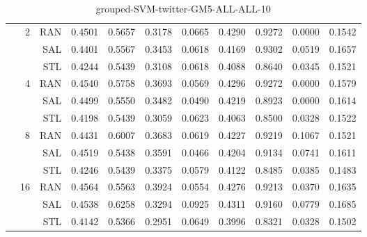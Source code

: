 \begin{center}
\begin{table}[htbp]
\begin{center}
\begin{tabular}{ | r | r | r | r | r | r | r | r | r | r | r |}
 & \multirow{3}{*}{2} & RAN & 0.4501 & 0.5657 & 0.3178 & 0.0665 & 0.4290 & 0.9272 & 0.0000 & 0.1542\\ \cline{3-11}
 &   & SAL & 0.4401 & 0.5567 & 0.3453 & 0.0618 & 0.4169 & 0.9302 & 0.0519 & 0.1657\\ \cline{3-11}
 &   & STL & 0.4244 & 0.5439 & 0.3108 & 0.0618 & 0.4088 & 0.8640 & 0.0345 & 0.1521\\ \cline{2-11}
 & \multirow{3}{*}{4} & RAN & 0.4540 & 0.5758 & 0.3693 & 0.0569 & 0.4296 & 0.9272 & 0.0000 & 0.1579\\ \cline{3-11}
 &   & SAL & 0.4499 & 0.5550 & 0.3482 & 0.0490 & 0.4219 & 0.8923 & 0.0000 & 0.1614\\ \cline{3-11}
 &   & STL & 0.4198 & 0.5439 & 0.3059 & 0.0623 & 0.4063 & 0.8500 & 0.0328 & 0.1522\\ \cline{2-11}
 & \multirow{3}{*}{8} & RAN & 0.4431 & 0.6007 & 0.3683 & 0.0619 & 0.4227 & 0.9219 & 0.1067 & 0.1521\\ \cline{3-11}
 &   & SAL & 0.4519 & 0.5438 & 0.3591 & 0.0466 & 0.4204 & 0.9134 & 0.0741 & 0.1611\\ \cline{3-11}
 &   & STL & 0.4246 & 0.5439 & 0.3375 & 0.0579 & 0.4122 & 0.8485 & 0.0385 & 0.1483\\ \cline{2-11}
 & \multirow{3}{*}{16} & RAN & 0.4564 & 0.5563 & 0.3924 & 0.0554 & 0.4276 & 0.9213 & 0.0370 & 0.1635\\ \cline{3-11}
 &   & SAL & 0.4538 & 0.6258 & 0.3294 & 0.0925 & 0.4311 & 0.9160 & 0.0779 & 0.1685\\ \cline{3-11}
 &   & STL & 0.4142 & 0.5366 & 0.2951 & 0.0649 & 0.3996 & 0.8321 & 0.0328 & 0.1502\\ \cline{2-11}
\hline
\end{tabular}
\caption{grouped-SVM-twitter-GM5-ALL-ALL-10}
\end{center}
 \end{table}
\end{center}

